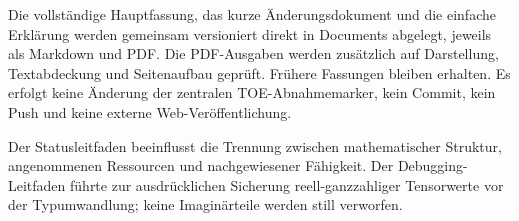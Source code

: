 Die vollständige Hauptfassung, das kurze Änderungsdokument und die
einfache Erklärung werden gemeinsam versioniert direkt in Documents
abgelegt, jeweils als Markdown und PDF. Die PDF-Ausgaben werden
zusätzlich auf Darstellung, Textabdeckung und Seitenaufbau geprüft.
Frühere Fassungen bleiben erhalten. Es erfolgt keine Änderung der
zentralen TOE-Abnahmemarker, kein Commit, kein Push und keine externe
Web-Veröffentlichung.

Der Statusleitfaden beeinflusst die Trennung zwischen mathematischer
Struktur, angenommenen Ressourcen und nachgewiesener Fähigkeit. Der
Debugging-Leitfaden führte zur ausdrücklichen Sicherung
reell-ganzzahliger Tensorwerte vor der Typumwandlung; keine
Imaginärteile werden still verworfen.

